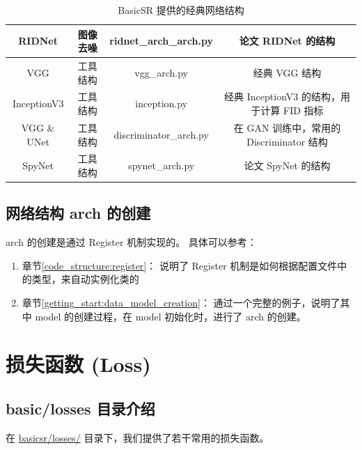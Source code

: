 \documentclass[../main.tex]{subfiles}
\begin{document}
\begin{table}[h]
{\begin{tabular}{|c|c|c|c|}
            RIDNet            & 图像去噪      & ridnet\_arch\_arch.py  & 论文 RIDNet 的结构                       \\ \hline
            VGG               & 工具结构      & vgg\_arch.py           & 经典 VGG 结构                            \\ \hline
            InceptionV3       & 工具结构      & inception.py           & 经典 InceptionV3 的结构，用于计算 FID 指标 \\ \hline
            VGG \& UNet       & 工具结构      & discriminator\_arch.py & 在 GAN 训练中，常用的 Discriminator 结构   \\ \hline
            SpyNet            & 工具结构      & spynet\_arch.py        & 论文 SpyNet 的结构                       \\ \hline
        \end{tabular}
    }
    \caption{BasicSR 提供的经典网络结构}
\end{table}

\subsection{网络结构 arch 的创建}\label{code_structure:arch_creation}

arch 的创建是通过 Register 机制实现的。
具体可以参考：
\begin{enumerate}
    \item 章节\ref{code_structure:register}： 说明了 Register 机制是如何根据配置文件中的类型，来自动实例化类的
    \item 章节\ref{getting_start:data_model_creation}： 通过一个完整的例子，说明了其中 model 的创建过程，在 model 初始化时，进行了 arch 的创建。
\end{enumerate}

\section{损失函数 (Loss)}\label{code_structure:loss}

\subsection{basic/losses 目录介绍}\label{code_structure:loss_contents}
在 \href{https://github.com/XPixelGroup/BasicSR/tree/master/basicsr/losses}{basicsr/losses/} 目录下，我们提供了若干常用的损失函数。
\end{document}
